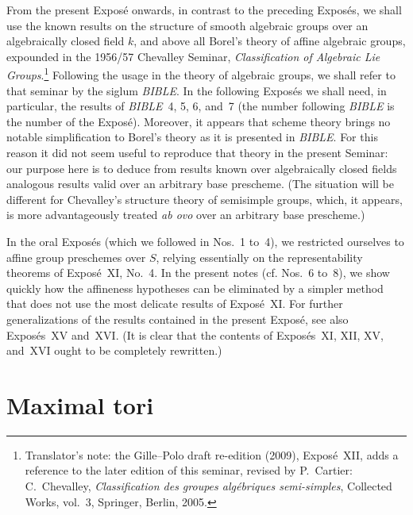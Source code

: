 


From the present Exposé onwards, in contrast to the preceding Exposés,
we shall use the known results on the structure of smooth algebraic
groups over an algebraically closed field \(k\), and above all Borel's
theory of affine algebraic groups, expounded in the 1956/57 Chevalley
Seminar, \emph{Classification of Algebraic Lie Groups}.\footnote{Translator's note: the Gille--Polo draft
re-edition (2009), Exposé~XII, adds a reference to the later edition of this seminar, revised by
P.~Cartier: C.~Chevalley, \textit{Classification des groupes algébriques semi-simples}, Collected
Works, vol.~3, Springer, Berlin, 2005.} Following the usage in the theory of algebraic groups, we shall
refer to that seminar by the siglum \emph{BIBLE}. In the following
Exposés we shall need, in particular, the results of \emph{BIBLE}~4,
5, 6, and~7 (the number following \emph{BIBLE} is the number of the
Exposé). Moreover, it appears that scheme theory brings no notable
simplification to Borel's theory as it is presented in \emph{BIBLE}.
For this reason it did not seem useful to reproduce that theory in the
present Seminar: our purpose here is to deduce from results known over
algebraically closed fields analogous results valid over an arbitrary
base prescheme. (The situation will be different for Chevalley's
structure theory of semisimple groups, which, it appears, is more
advantageously treated \emph{ab ovo} over an arbitrary base
prescheme.)

In the oral Exposés (which we followed in Nos.~1 to~4), we restricted
ourselves to affine group preschemes over \(S\), relying essentially on
the representability theorems of Exposé~XI, No.~4. In the present notes
(cf. Nos.~6 to~8), we show quickly how the affineness hypotheses can be
eliminated by a simpler method that does not use the most delicate
results of Exposé~XI. For further generalizations of the results
contained in the present Exposé, see also Exposés~XV and~XVI. (It is
clear that the contents of Exposés~XI, XII, XV, and~XVI ought to be
completely rewritten.)

\section{Maximal tori}

